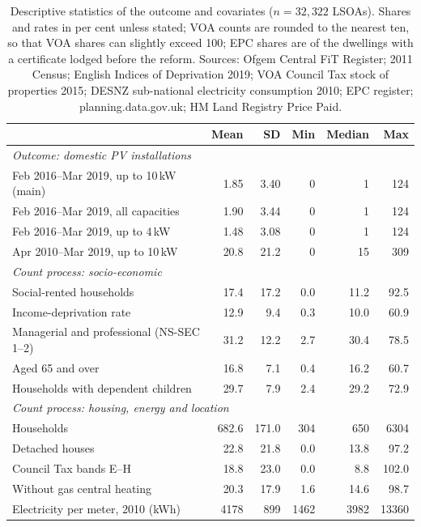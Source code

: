 \begin{table}[htbp]
\centering
\caption{Descriptive statistics of the outcome and covariates ($n = 32{,}322$ LSOAs). Shares and rates in per cent unless stated; VOA counts are rounded to the nearest ten, so that VOA shares can slightly exceed 100; EPC shares are of the dwellings with a certificate lodged before the reform. Sources: Ofgem Central FiT Register; 2011 Census; English Indices of Deprivation 2019; VOA Council Tax stock of properties 2015; DESNZ sub-national electricity consumption 2010; EPC register; planning.data.gov.uk; HM Land Registry Price Paid.}\label{tab:app_desc}
\small
\begin{tabular}{lrrrrr}
\toprule
 & Mean & SD & Min & Median & Max \\
\midrule
\multicolumn{6}{l}{\textit{Outcome: domestic PV installations}} \\
\quad 8 Feb 2016--Mar 2019, up to 10\,kW (main) & 1.85 & 3.40 & 0 & 1 & 124 \\
\quad 8 Feb 2016--Mar 2019, all capacities & 1.90 & 3.44 & 0 & 1 & 124 \\
\quad 8 Feb 2016--Mar 2019, up to 4\,kW & 1.48 & 3.08 & 0 & 1 & 124 \\
\quad Apr 2010--Mar 2019, up to 10\,kW & 20.8 & 21.2 & 0 & 15 & 309 \\
\midrule
\multicolumn{6}{l}{\textit{Count process: socio-economic}} \\
\quad Social-rented households & 17.4 & 17.2 & 0.0 & 11.2 & 92.5 \\
\quad Income-deprivation rate & 12.9 & 9.4 & 0.3 & 10.0 & 60.9 \\
\quad Managerial and professional (NS-SEC 1--2) & 31.2 & 12.2 & 2.7 & 30.4 & 78.5 \\
\quad Aged 65 and over & 16.8 & 7.1 & 0.4 & 16.2 & 60.7 \\
\quad Households with dependent children & 29.7 & 7.9 & 2.4 & 29.2 & 72.9 \\
\multicolumn{6}{l}{\textit{Count process: housing, energy and location}} \\
\quad Households & 682.6 & 171.0 & 304 & 650 & 6304 \\
\quad Detached houses & 22.8 & 21.8 & 0.0 & 13.8 & 97.2 \\
\quad Council Tax bands E--H & 18.8 & 23.0 & 0.0 & 8.8 & 102.0 \\
\quad Without gas central heating & 20.3 & 17.9 & 1.6 & 14.6 & 98.7 \\
\quad Electricity per meter, 2010 (kWh) & 4178 & 899 & 1462 & 3982 & 13360 \\

\end{tabular}
\end{table}
